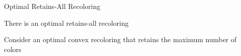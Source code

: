 \begin{frame}{Optimal Retains-All Recoloring}
\begin{lemma}
There is an optimal retains-all recoloring
\end{lemma}
Consider an optimal convex recoloring that retains the maximum number of colors

\end{frame}